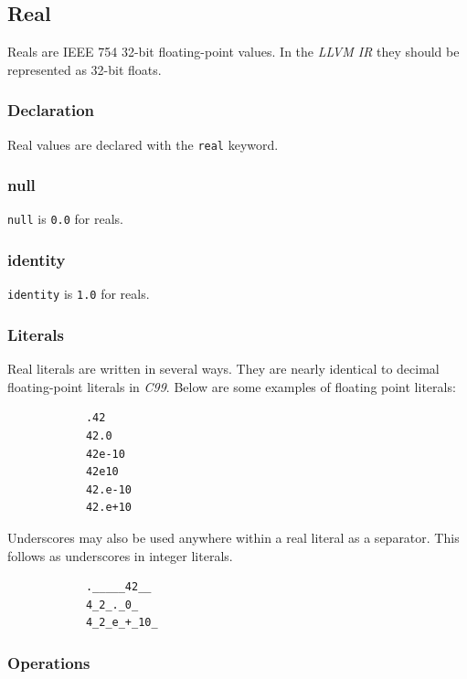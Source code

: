 \documentclass{article}
\begin{document}
	\subsection{Real}\label{sec:real}

		Reals are IEEE 754 32-bit floating-point values. In the \textit{LLVM IR} they should be represented as 32-bit
		floats.

	\subsubsection{Declaration}

		Real values are declared with the \texttt{real} keyword.

	\subsubsection{null}

		\texttt{null} is \texttt{0.0} for reals.

	\subsubsection{identity}

		\texttt{identity} is \texttt{1.0} for reals.

	\subsubsection{Literals}

		Real literals are written in several ways. They are nearly identical to decimal floating-point literals in
		\textit{C99}. Below are some examples of floating point literals:

		\begin{lstlisting}
			.42
			42.0
			42e-10
			42e10
			42.e-10
			42.e+10
		\end{lstlisting}

		Underscores may also be used anywhere within a real literal as a separator.  This follows as underscores in
		integer literals.

		\begin{lstlisting}
			._____42__
			4_2_._0_
			4_2_e_+_10_
		\end{lstlisting}

	\subsubsection{Operations}
\end{document}
